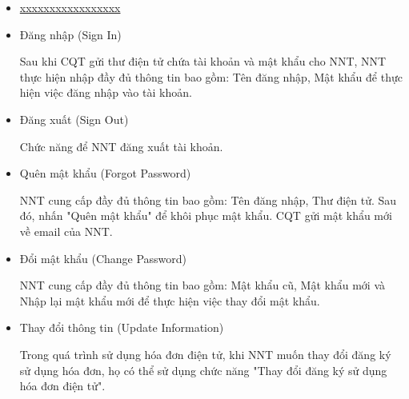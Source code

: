 \begin{itemize}
\begin{itemize}





              \item \underline{xxxxxxxxxxxxxxxxx}

              \item Đăng nhập (Sign In)

                    Sau khi CQT gửi thư điện tử chứa tài khoản và mật khẩu cho NNT, NNT thực hiện nhập đầy đủ thông tin bao gồm: Tên đăng nhập, Mật khẩu để thực hiện việc đăng nhập vào tài khoản.

              \item Đăng xuất (Sign Out)

                    Chức năng để NNT đăng xuất tài khoản.

              \item Quên mật khẩu (Forgot Password)

                    NNT cung cấp đầy đủ thông tin bao gồm: Tên đăng nhập, Thư điện tử. Sau đó, nhấn "Quên mật khẩu" để khôi phục mật khẩu. CQT gửi mật khẩu mới về email của NNT.

              \item Đổi mật khẩu (Change Password)

                    NNT cung cấp đầy đủ thông tin bao gồm: Mật khẩu cũ, Mật khẩu mới và Nhập lại mật khẩu mới để thực hiện việc thay đổi mật khẩu.

              \item Thay đổi thông tin (Update Information)

                    Trong quá trình sử dụng hóa đơn điện tử, khi NNT muốn thay đổi đăng ký sử dụng hóa đơn, họ có thể sử dụng chức năng "Thay đổi đăng ký sử dụng hóa đơn điện tử".


\end{itemize}
\end{itemize}
